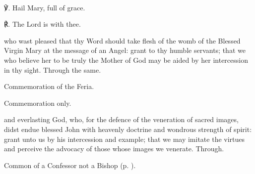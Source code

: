 	
\secondEvensong
{}\\
	
	℣. Hail Mary, full of grace.

	℟. The Lord is with thee.


\collect
{} who wast pleased that thy Word should take flesh of the womb of the Blessed Virgin Mary at the message of an Angel: grant to thy humble servants; that we who believe her to be truly the Mother of God may be aided by her intercession in thy sight. Through the same.
\begin{rubric}
    Commemoration of the Feria.%
\end{rubric}



\begin{rubric}
	Commemoration only.
\end{rubric}


{} and everlasting God, who, for the defence of the veneration of sacred images, didst endue blessed John with heavenly doctrine and wondrous strength of spirit: grant unto us by his intercession and example; that we may imitate the virtues and perceive the advocacy of those whose images we venerate. Through.



\begin{rubric}
	Common of a Confessor not a Bishop (p. \pageref{AbbotCollect}).
\end{rubric}


